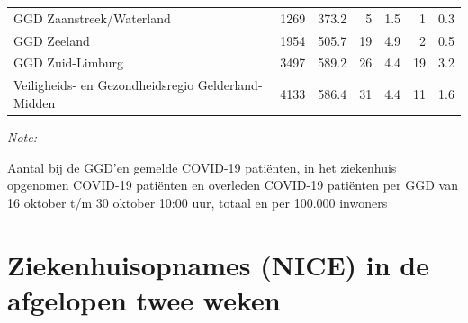 \documentclass[
  english,
  man,floatsintext]{apa6}
\begin{document}
\begin{table}
\begin{threeparttable}
\begin{tabular}{lrrrrrr}
GGD Zaanstreek/Waterland & 1269 & 373.2 & 5 & 1.5 & 1 & 0.3\\
GGD Zeeland & 1954 & 505.7 & 19 & 4.9 & 2 & 0.5\\
GGD Zuid-Limburg & 3497 & 589.2 & 26 & 4.4 & 19 & 3.2\\
Veiligheids- en Gezondheidsregio Gelderland-Midden & 4133 & 586.4 & 31 & 4.4 & 11 & 1.6\\
\bottomrule
\end{tabular}
\begin{tablenotes}
\item \textit{Note: } 
\item Aantal bij de GGD’en gemelde COVID-19 patiënten, in het ziekenhuis opgenomen COVID-19 patiënten en overleden COVID-19 patiënten per GGD van 16 oktober t/m 30 oktober 10:00 uur, totaal en per 100.000 inwoners
\end{tablenotes}
\end{threeparttable}
\endgroup{}
\end{table}

\newpage

\hypertarget{ziekenhuisopnames-nice-in-de-afgelopen-twee-weken}{%
\section{Ziekenhuisopnames (NICE) in de afgelopen twee weken}\label{ziekenhuisopnames-nice-in-de-afgelopen-twee-weken}}
\end{document}
